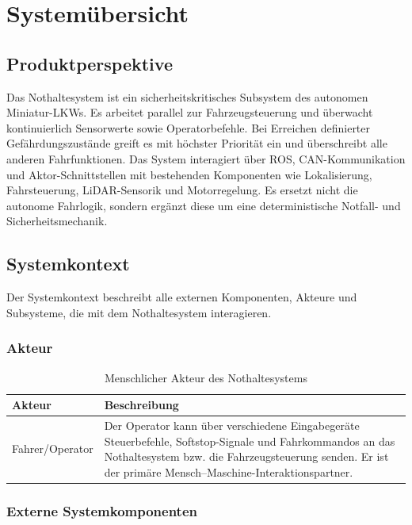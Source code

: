 \section{Systemübersicht} 
\subsection{Produktperspektive}
Das Nothaltesystem ist ein sicherheitskritisches Subsystem des autonomen Miniatur-LKWs.
Es arbeitet parallel zur Fahrzeugsteuerung und überwacht kontinuierlich Sensorwerte sowie Operatorbefehle.
Bei Erreichen definierter Gefährdungszustände greift es mit höchster Priorität ein und überschreibt alle anderen Fahrfunktionen.
Das System interagiert über ROS, CAN-Kommunikation und Aktor-Schnittstellen mit bestehenden Komponenten wie Lokalisierung, Fahrsteuerung, LiDAR-Sensorik und Motorregelung.
Es ersetzt nicht die autonome Fahrlogik, sondern ergänzt diese um eine deterministische Notfall- und Sicherheitsmechanik.

\subsection{Systemkontext}
\label{sec:systemkontext}

Der Systemkontext beschreibt alle externen Komponenten, Akteure und Subsysteme, die mit dem Nothaltesystem interagieren.

\subsubsection{Akteur}

\begin{table}[H]
  \centering
  \caption{Menschlicher Akteur des Nothaltesystems}
  \label{tab:akteur_nothalt}
  \begin{tabularx}{\textwidth}{lX}
    \toprule
    \textbf{Akteur} & \textbf{Beschreibung} \\
    \midrule
    Fahrer/Operator &
    Der Operator kann über verschiedene Eingabegeräte Steuerbefehle,
    Softstop-Signale und Fahrkommandos an das Nothaltesystem bzw.
    die Fahrzeugsteuerung senden. Er ist der primäre
    Mensch–Maschine-Interaktionspartner. \\
    \bottomrule
  \end{tabularx}
\end{table}

\subsubsection{Externe Systemkomponenten}

